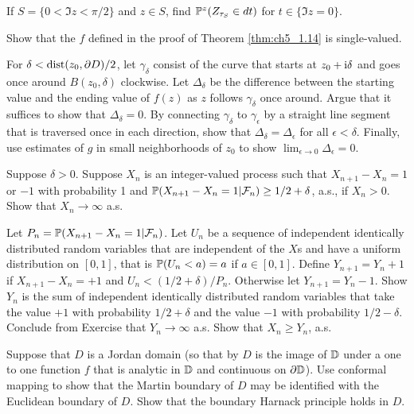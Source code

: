 \begin{exercise}\label{ex:ch5_3}
If $S = \{0 < \Im z < \pi/2\}$ and $z \in S$, find $\P^z(Z_{\tau_S} \in dt)$ for $t \in \{\Im z = 0\}$.
\end{exercise}

\begin{exercise}\label{ex:ch5_4}
Show that the $f$ defined in the proof of Theorem \ref{thm:ch5_1.14} is single-valued.

\hint For $\delta < \dist(z_0,\partial D)/2$, let $\gamma_\delta$ consist of the curve that starts at $z_0 + \im\delta$ and goes once around $B(z_0,\delta)$ clockwise. Let $\Delta_\delta$ be the difference between the starting value and the ending value of $f(z)$ as $z$ follows $\gamma_\delta$ once around. Argue that it suffices to show that $\Delta_\delta = 0$. By connecting $\gamma_\delta$ to $\gamma_\epsilon$ by a straight line segment that is traversed once in each direction, show that $\Delta_\delta = \Delta_\epsilon$ for all $\epsilon < \delta$. Finally, use estimates of $g$ in small neighborhoods of $z_0$ to show $\lim_{\epsilon \to 0} \Delta_\epsilon = 0$.
\end{exercise}

\begin{exercise}\label{ex:ch5_5}
Suppose $\delta > 0$. Suppose $X_n$ is an integer-valued process such that $X_{n+1} - X_n = 1$ or $-1$ with probability 1 and $\P(X_{n+1} - X_n = 1\mid \FC_n) \geq 1/2 + \delta$, a.s., if $X_n > 0$. Show that $X_n \to \infty$ a.s.

\hint Let $P_n = \P(X_{n+1} - X_n = 1\mid \FC_n)$. Let $U_n$ be a sequence of independent identically distributed random variables that are independent of the $X$s and have a uniform distribution on $[0,1]$, that is $\P(U_n < a) = a$ if $a \in [0,1]$. Define $Y_{n+1} = Y_n + 1$ if $X_{n+1} - X_n = +1$ and $U_n < (1/2+\delta)/P_n$. Otherwise let $Y_{n+1} = Y_n - 1$. Show $Y_n$ is the sum of independent identically distributed random variables that take the value $+1$ with probability $1/2+\delta$ and the value $-1$ with probability $1/2-\delta$. Conclude from Exercise  that $Y_n \to \infty$ a.s. Show that $X_n \geq Y_n$, a.s.
\end{exercise}

\begin{exercise}\label{ex:ch5_6}
Suppose that $D$ is a Jordan domain (so that by \cite{Pommerenke1975} $D$ is the image of $\D$ under a one to one function $f$ that is analytic in $\D$ and continuous on $\partial\D$). Use conformal mapping to show that the Martin boundary of $D$ may be identified with the Euclidean boundary of $D$. Show that the boundary Harnack principle holds in $D$.
\end{exercise}

